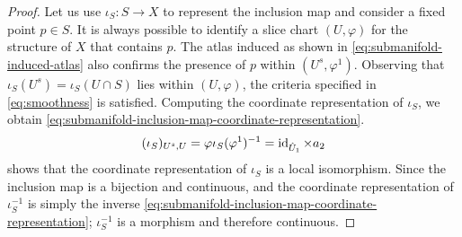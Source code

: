 \documentclass[../main-manifolds.tex]{subfiles}
\begin{document}
\begin{proof}
    Let us use $\iota_{S}: S\to X$ to represent the inclusion map and consider a fixed point $p\in S$. It is always possible to identify a slice chart $(U,\varphi)$ for the structure of $X$ that contains $p$. The atlas induced as shown in \cref{eq:submanifold-induced-atlas} also confirms the presence of $p$ within $(U^s,\varphi^1)$. Observing that $\iota_S(U^s) = \iota_S(U\cap S)$ lies within $(U,\varphi)$, the criteria specified in \cref{eq:smoothness} is satisfied. Computing the coordinate representation of $\iota_S$, we obtain \cref{eq:submanifold-inclusion-map-coordinate-representation}.
    \begin{equation}\label{eq:submanifold-inclusion-map-coordinate-representation}
        (\iota_S)_{U^s,U} = \varphi\iota_S(\varphi^1)^{-1} = \operatorname{id}_{\hat{U}_1}\times a_2
    \end{equation}
     shows that the coordinate representation of $\iota_S$ is a local isomorphism. Since the inclusion map is a bijection and continuous, and the coordinate representation of $\iota_S^{-1}$ is simply the inverse \cref{eq:submanifold-inclusion-map-coordinate-representation}; $\iota_S^{-1}$ is a morphism and therefore continuous.
\end{proof}
\end{document}
